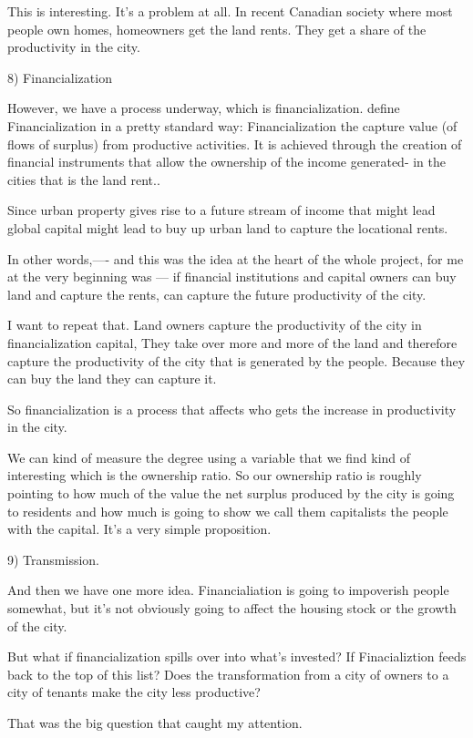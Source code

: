 This is interesting. It's a problem at all. In recent Canadian society where most people own homes,  homeowners get the land rents. They get a share of the productivity in the city.


8) Financialization

However, we have a process underway, which is financialization. 
\I define Financialization in a pretty standard way: Financialization the capture value (of flows of surplus) from productive activities. 
It is achieved through the creation of financial instruments that allow the ownership of the income generated- in the cities that is the land rent.. 

Since urban property gives rise to a future stream of income that might lead global capital might lead to buy up urban land to capture the locational rents. 

In other words,---- and this was the idea at the heart of the whole project, for me at the very beginning was --- if financial institutions and capital owners can buy land and capture the rents, can capture the future productivity of the city.

I want to repeat that. Land owners capture the productivity of the city in financialization capital, 
They take over more and more of the land and therefore capture the productivity of the city that is generated by the people. Because they can buy the land they can capture it. 

So financialization is a process that affects 
who gets the increase in productivity in the city.

We can kind of measure the degree using a variable that we find kind of interesting which is the ownership ratio. So our ownership ratio is roughly pointing to how much of the value the net surplus produced by the city is going to residents and how much is going to show we call them capitalists the people with the capital.
It's a very simple proposition.

9) Transmission.

And then we have one more idea.  Financialiation is going to impoverish people somewhat, but it's not obviously going to affect the housing stock or the growth of the city. 

But what if financialization spills over into what's invested?  If Finacializtion feeds back to the top of this list? Does the transformation from a city of owners to a city of tenants make the city less productive? 

That was the big question that caught my attention. 

